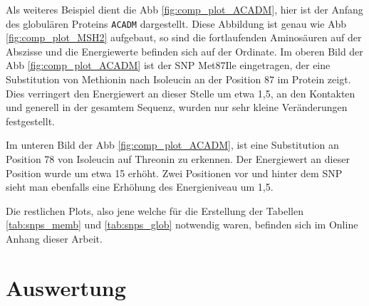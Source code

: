 Als weiteres Beispiel dient die \ac{Abb} \ref{fig:comp_plot_ACADM}, hier ist der Anfang des globulären Proteins \texttt{ACADM} dargestellt. Diese Abbildung ist genau wie \ac{Abb} \ref{fig:comp_plot_MSH2} aufgebaut, so sind die fortlaufenden Aminosäuren auf der Abszisse und die Energiewerte befinden sich auf der Ordinate. Im oberen Bild der \ac{Abb} \ref{fig:comp_plot_ACADM} ist der \ac{SNP} Met87Ile eingetragen, der eine Substitution von Methionin nach Isoleucin an der Position 87 im Protein zeigt. Dies verringert den Energiewert an dieser Stelle um etwa 1,5, an den Kontakten und generell in der gesamtem Sequenz, wurden nur sehr kleine Veränderungen festgestellt.

Im unteren Bild der \ac{Abb} \ref{fig:comp_plot_ACADM}, ist eine Substitution an Position 78 von Isoleucin auf Threonin zu erkennen. Der Energiewert an dieser Position wurde um etwa 15 erhöht. Zwei Positionen vor und hinter dem \ac{SNP} sieht man ebenfalls eine Erhöhung des Energieniveau um 1,5.

Die restlichen Plots, also jene welche für die Erstellung der Tabellen \ref{tab:snps_memb} und \ref{tab:snps_glob} notwendig waren, befinden sich im Online Anhang dieser Arbeit.



\newpage
\section{Auswertung}
\label{sec:snp_auswertung}

